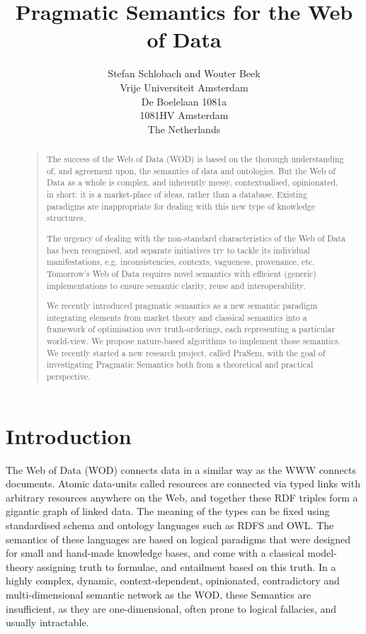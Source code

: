\documentclass[letterpaper]{article}
\begin{document}
\title{Pragmatic Semantics for the Web of Data}
\author{Stefan Schlobach and Wouter Beek\\
Vrije Universiteit Amsterdam\\
De Boelelaan 1081a\\
1081HV Amsterdam\\
The Netherlands}
\maketitle
\begin{abstract}
\begin{quote}
The success of the Web of Data (WOD) is based on the thorough understanding of, and agreement upon, the semantics of data and ontologies. But the Web of Data as a whole is complex, and inherently messy, contextualised, opinionated, in short: it is a market-place of ideas, rather than a database. Existing paradigms are inappropriate for dealing with this new type of knowledge structures.

The urgency of dealing with the non-standard characteristics of the Web of Data has been recognised, and separate initiatives try to tackle its individual manifestations, e.g. inconsistencies, contexts, vagueness, provenance, etc. Tomorrow's Web of Data requires novel semantics with efficient (generic) implementations to ensure semantic clarity, reuse and interoperability.

We recently introduced pragmatic semantics  as a new semantic paradigm integrating elements from market theory and classical semantics into a framework of optimisation over truth-orderings, each representing a particular world-view. We propose nature-based algorithms to implement those semantics. We recently started a new research project, called PraSem, with the goal of investigating Pragmatic Semantics both from a theoretical and practical perspective.
\end{quote}
\end{abstract}

\section{Introduction}


 The Web of Data (WOD) connects data in a similar way as the WWW connects documents. Atomic data-units called resources are connected via typed links with arbitrary resources anywhere on the Web, and together these RDF triples form a gigantic graph of linked data. The meaning of the types can be fixed using standardised schema and ontology languages such as RDFS and OWL. The semantics of these languages are based on logical paradigms that were designed for small and hand-made knowledge bases, and come with a classical model-theory assigning truth to formulae, and entailment based on this truth. In a highly complex, dynamic, context-dependent, opinionated, contradictory and multi-dimensional semantic network as the WOD, these Semantics are insufficient, as they are one-dimensional, often prone to logical fallacies, and usually intractable.
\end{document}
